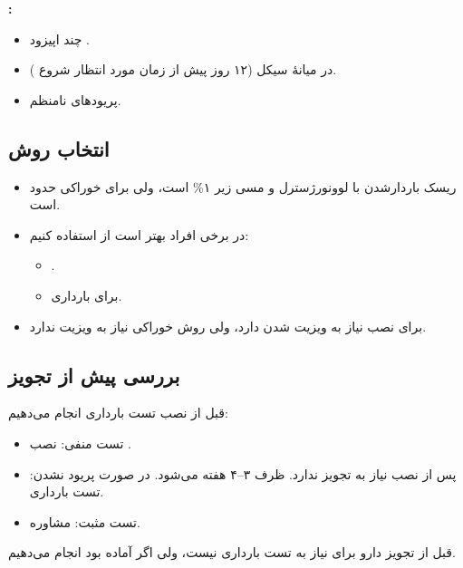 \documentclass[12pt,a4paper]{article}
\begin{document}
\textbf{:}
\begin{itemize}
  \item چند اپیزود .
  \item {} در میانهٔ سیکل (۱۲ روز پیش از زمان مورد انتظار شروع ).
  \item پریودهای نامنظم.
\end{itemize}

\subsection*{انتخاب روش }
\begin{itemize}
  \item ریسک باردارشدن با  لوونورژسترل و  مسی زیر ۱\% است، ولی برای  خوراکی حدود  است.
  \item در برخی افراد بهتر است از  استفاده کنیم:
  \begin{itemize}
    \item {}.
    \item {} برای بارداری.
  \end{itemize}
  \item {} برای نصب نیاز به ویزیت شدن دارد، ولی روش خوراکی نیاز به ویزیت ندارد.
\end{itemize}

\subsection*{بررسی پیش از تجویز}
قبل از نصب  تست بارداری انجام می‌دهیم:
\begin{itemize}
  \item تست منفی: نصب .
  \item پس از نصب  نیاز به تجویز  ندارد. ظرف ۳–۴ هفته  می‌شود. در صورت پریود نشدن: تست بارداری.
  \item تست مثبت: مشاوره.
\end{itemize}

قبل از تجویز دارو برای  نیاز به تست بارداری نیست، ولی اگر آماده بود انجام می‌دهیم.
\end{document}

